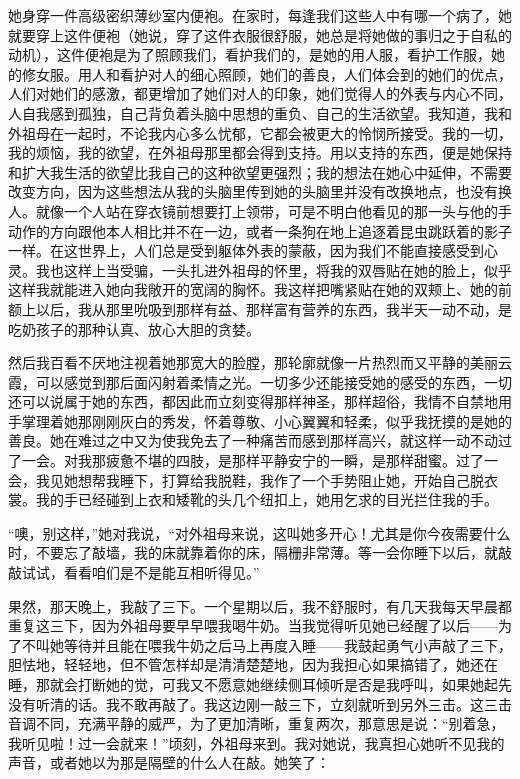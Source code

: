 \par 她身穿一件高级密织薄纱室内便袍。在家时，每逢我们这些人中有哪一个病了，她就要穿上这件便袍（她说，穿了这件衣服很舒服，她总是将她做的事归之于自私的动机），这件便袍是为了照顾我们，看护我们的，是她的用人服，看护工作服，她的修女服。用人和看护对人的细心照顾，她们的善良，人们体会到的她们的优点，人们对她们的感激，都更增加了她们对人的印象，她们觉得人的外表与内心不同，人自我感到孤独，自己背负着头脑中思想的重负、自己的生活欲望。我知道，我和外祖母在一起时，不论我内心多么忧郁，它都会被更大的怜悯所接受。我的一切，我的烦恼，我的欲望，在外祖母那里都会得到支持。用以支持的东西，便是她保持和扩大我生活的欲望比我自己的这种欲望更强烈；我的想法在她心中延伸，不需要改变方向，因为这些想法从我的头脑里传到她的头脑里并没有改换地点，也没有换人。就像一个人站在穿衣镜前想要打上领带，可是不明白他看见的那一头与他的手动作的方向跟他本人相比并不在一边，或者一条狗在地上追逐着昆虫跳跃着的影子一样。在这世界上，人们总是受到躯体外表的蒙蔽，因为我们不能直接感受到心灵。我也这样上当受骗，一头扎进外祖母的怀里，将我的双唇贴在她的脸上，似乎这样我就能进入她向我敞开的宽阔的胸怀。我这样把嘴紧贴在她的双颊上、她的前额上以后，我从那里吮吸到那样有益、那样富有营养的东西，我半天一动不动，是吃奶孩子的那种认真、放心大胆的贪婪。
\par 然后我百看不厌地注视着她那宽大的脸膛，那轮廓就像一片热烈而又平静的美丽云霞，可以感觉到那后面闪射着柔情之光。一切多少还能接受她的感受的东西，一切还可以说属于她的东西，都因此而立刻变得那样神圣，那样超俗，我情不自禁地用手掌理着她那刚刚灰白的秀发，怀着尊敬、小心翼翼和轻柔，似乎我抚摸的是她的善良。她在难过之中又为使我免去了一种痛苦而感到那样高兴，就这样一动不动过了一会。对我那疲惫不堪的四肢，是那样平静安宁的一瞬，是那样甜蜜。过了一会，我见她想帮我睡下，打算给我脱鞋，我作了一个手势阻止她，开始自己脱衣裳。我的手已经碰到上衣和矮靴的头几个纽扣上，她用乞求的目光拦住我的手。
\par “噢，别这样，”她对我说，“对外祖母来说，这叫她多开心！尤其是你今夜需要什么时，不要忘了敲墙，我的床就靠着你的床，隔栅非常薄。等一会你睡下以后，就敲敲试试，看看咱们是不是能互相听得见。”
\par 果然，那天晚上，我敲了三下。一个星期以后，我不舒服时，有几天我每天早晨都重复这三下，因为外祖母要早早喂我喝牛奶。当我觉得听见她已经醒了以后——为了不叫她等待并且能在喂我牛奶之后马上再度入睡——我鼓起勇气小声敲了三下，胆怯地，轻轻地，但不管怎样却是清清楚楚地，因为我担心如果搞错了，她还在睡，那就会打断她的觉，可我又不愿意她继续侧耳倾听是否是我呼叫，如果她起先没有听清的话。我不敢再敲了。我这边刚一敲三下，立刻就听到另外三击。这三击音调不同，充满平静的威严，为了更加清晰，重复两次，那意思是说：“别着急，我听见啦！过一会就来！”顷刻，外祖母来到。我对她说，我真担心她听不见我的声音，或者她以为那是隔壁的什么人在敲。她笑了：
